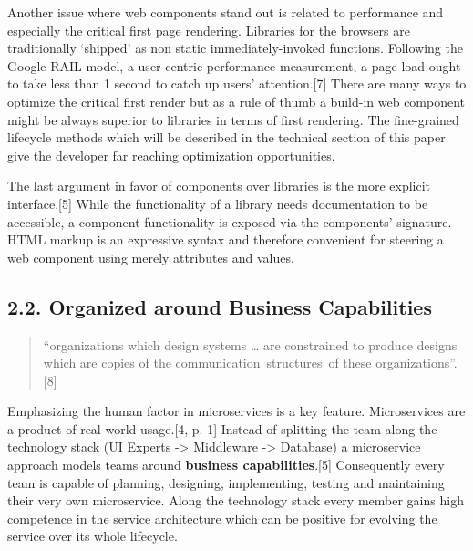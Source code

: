 \documentclass[]{article}
\begin{document}
Another issue where web components stand out is related to performance
and especially the critical first page rendering. Libraries for the
browsers are traditionally `shipped' as non static immediately-invoked
functions. Following the Google RAIL model, a user-centric performance
measurement, a page load ought to take less than 1 second to catch up
users' attention.{[}7{]} There are many ways to optimize the critical
first render but as a rule of thumb a build-in web component might be
always superior to libraries in terms of first rendering. The
fine-grained lifecycle methods which will be described in the technical
section of this paper give the developer far reaching optimization
opportunities.

The last argument in favor of components over libraries is the more
explicit interface.{[}5{]} While the functionality of a library needs
documentation to be accessible, a component functionality is exposed via
the components' signature. HTML markup is an expressive syntax and
therefore convenient for steering a web component using merely
attributes and values.

\subsection{2.2. Organized around Business
Capabilities}\label{organized-around-business-capabilities}

\begin{quote}
``organizations which design systems \ldots{} are constrained to produce
designs which are copies of the communication~structures~of these
organizations''. {[}8{]}
\end{quote}

Emphasizing the human factor in microservices is a key feature.
Microservices are a product of real-world usage.{[}4, p. 1{]} Instead of
splitting the team along the technology stack (UI Experts
-\textgreater{} Middleware -\textgreater{} Database) a microservice
approach models teams around \textbf{business capabilities}.{[}5{]}
Consequently every team is capable of planning, designing, implementing,
testing and maintaining their very own microservice. Along the
technology stack every member gains high competence in the service
architecture which can be positive for evolving the service over its
whole lifecycle.
\end{document}
